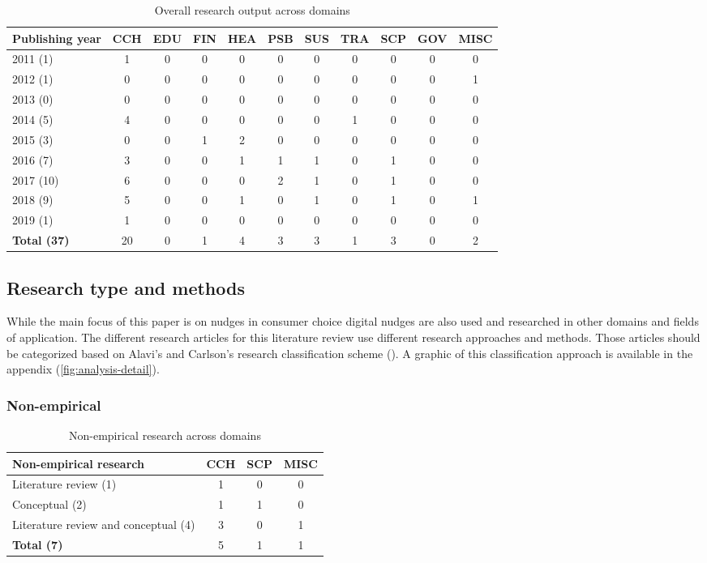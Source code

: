 \begin{table}[htbp]
\centering
\small
\begin{tabular}{l|cccccccccc}
\textbf{Publishing year} & \textbf{CCH} & \textbf{EDU} & \textbf{FIN} & \textbf{HEA} & \textbf{PSB} & \textbf{SUS} & \textbf{TRA} & \textbf{SCP} & \textbf{GOV} & \textbf{MISC} \\ \hline
2011 (1) & 1 & 0 & 0 & 0 & 0 & 0 & 0 & 0 & 0 &  0 \\
2012 (1) & 0 & 0 & 0 & 0 & 0 & 0 & 0 & 0 & 0 & 1 \\
2013 (0) & 0 & 0 & 0 & 0 & 0 & 0 & 0 & 0 & 0 & 0 \\
2014 (5) & 4 & 0 & 0 & 0 & 0 & 0 & 1 & 0 & 0 & 0 \\
2015 (3) & 0 & 0 & 1 & 2 & 0 & 0 & 0 & 0 & 0 & 0 \\
2016 (7) & 3 & 0 & 0 & 1 & 1 & 1 & 0 & 1 & 0 & 0 \\
2017 (10) & 6 & 0 & 0 & 0 & 2 & 1 & 0 & 1 & 0 & 0 \\
2018 (9) & 5 & 0 & 0 & 1 & 0 & 1 & 0 & 1 & 0 & 1 \\
2019 (1) & 1 & 0 & 0 & 0 & 0 & 0 & 0 & 0 & 0 & 0 \\ \hline
\textbf{Total (37)} & 20 & 0 & 1 & 4 & 3 & 3 & 1 & 3 & 0 & 2
\end{tabular}
\caption{Overall research output across domains}
\label{table:research-output}
\end{table}


\subsection{Research type and methods}
While the main focus of this paper is on nudges in consumer choice digital nudges are also used and researched in other domains and fields of application. The different research articles for this literature review use different research approaches and methods. Those articles should be categorized based on Alavi's and Carlson's research classification scheme (\cite{alavi_review_1992}). A graphic of this classification approach is available in the appendix (\ref{fig:analysis-detail}).

\subsubsection{Non-empirical}
\begin{table}[htbp]
\centering
\begin{tabular}{l|ccc}
\textbf{Non-empirical research} & \textbf{CCH} & \textbf{SCP} & \textbf{MISC} \\ \hline
Literature review (1) & 1 & 0 & 0 \\
Conceptual (2) & 1 & 1 & 0 \\
Literature review and conceptual (4) & 3 & 0 & 1 \\ \hline
\textbf{Total (7)} & 5 & 1 & 1
\end{tabular}
\caption{Non-empirical research across domains}
\label{table:non-empirical}
\end{table}

